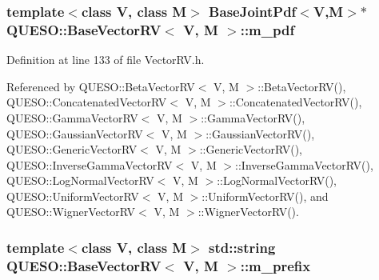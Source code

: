 \hypertarget{class_q_u_e_s_o_1_1_base_vector_r_v_a0ca926bca6fbcc688be6fc7496449e8e}{
\subsubsection[{m\-\_\-pdf}]{\setlength{\rightskip}{0pt plus 5cm}template$<$class V, class M$>$ {\bf Base\-Joint\-Pdf}$<$V,M$>$$\ast$ {\bf Q\-U\-E\-S\-O\-::\-Base\-Vector\-R\-V}$<$ V, M $>$\-::m\-\_\-pdf\hspace{0.3cm}{\ttfamily [protected]}}}\label{class_q_u_e_s_o_1_1_base_vector_r_v_a0ca926bca6fbcc688be6fc7496449e8e}


Definition at line 133 of file Vector\-R\-V.\-h.



Referenced by Q\-U\-E\-S\-O\-::\-Beta\-Vector\-R\-V$<$ V, M $>$\-::\-Beta\-Vector\-R\-V(), Q\-U\-E\-S\-O\-::\-Concatenated\-Vector\-R\-V$<$ V, M $>$\-::\-Concatenated\-Vector\-R\-V(), Q\-U\-E\-S\-O\-::\-Gamma\-Vector\-R\-V$<$ V, M $>$\-::\-Gamma\-Vector\-R\-V(), Q\-U\-E\-S\-O\-::\-Gaussian\-Vector\-R\-V$<$ V, M $>$\-::\-Gaussian\-Vector\-R\-V(), Q\-U\-E\-S\-O\-::\-Generic\-Vector\-R\-V$<$ V, M $>$\-::\-Generic\-Vector\-R\-V(), Q\-U\-E\-S\-O\-::\-Inverse\-Gamma\-Vector\-R\-V$<$ V, M $>$\-::\-Inverse\-Gamma\-Vector\-R\-V(), Q\-U\-E\-S\-O\-::\-Log\-Normal\-Vector\-R\-V$<$ V, M $>$\-::\-Log\-Normal\-Vector\-R\-V(), Q\-U\-E\-S\-O\-::\-Uniform\-Vector\-R\-V$<$ V, M $>$\-::\-Uniform\-Vector\-R\-V(), and Q\-U\-E\-S\-O\-::\-Wigner\-Vector\-R\-V$<$ V, M $>$\-::\-Wigner\-Vector\-R\-V().

\hypertarget{class_q_u_e_s_o_1_1_base_vector_r_v_a030ce3bc9873a9eaf6d8bf452c096ab3}{
\subsubsection[{m\-\_\-prefix}]{\setlength{\rightskip}{0pt plus 5cm}template$<$class V, class M$>$ std\-::string {\bf Q\-U\-E\-S\-O\-::\-Base\-Vector\-R\-V}$<$ V, M $>$\-::m\-\_\-prefix\hspace{0.3cm}{\ttfamily [protected]}}}\label{class_q_u_e_s_o_1_1_base_vector_r_v_a030ce3bc9873a9eaf6d8bf452c096ab3}


